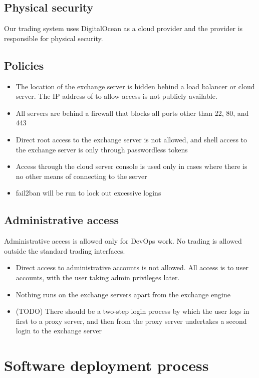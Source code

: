 \subsection{Physical security}
Our trading system uses DigitalOcean as a cloud provider and the
provider is responsible for physical security.


\subsection{Policies}
\begin{itemize}
  \item The location of the exchange server is hidden behind a load
  balancer or cloud server.  The IP address of to allow access is not
  publicly available.
  \item All servers are behind a firewall that blocks all ports other
    than 22, 80, and 443
  \item Direct root access to the exchange server is not allowed, and
    shell access to the exchange server is only through passwordless
    tokens
  \item Access through the cloud server console is used only in
    cases where there is no other means of connecting to the server
  \item fail2ban will be run to lock out excessive logins 
\end{itemize}

\subsection{Administrative access}
Administrative access is allowed only for DevOps work.  No trading is
allowed outside the standard trading interfaces.

\begin{itemize}
\item Direct access to administrative accounts is not allowed.  All
  access is to user accounts, with the user taking admin privileges
  later.
\item Nothing runs on the exchange servers apart from the exchange engine
\item (TODO) There should be a two-step login process by which the
  user logs in first to a proxy server, and then from the proxy server
  undertakes a second login to the exchange server
\end{itemize}

\section{Software deployment process}
